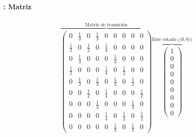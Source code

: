 \documentclass[../main.tex]{subfiles}
\begin{document}
\begin{frame}
  \frametitle{\SECTIONC}
  \framesubtitle{\EJC: Matriz}

  \begin{gather*}
    \overbrace{\begin{pmatrix}
        0 & \frac{1}{3} & 0 & \frac{1}{3} & 0 & 0 & 0 & 0 & 0  \\
        \frac{1}{2} & 0 & \frac{1}{2} & 0 & \frac{1}{4} & 0 & 0 & 0 & 0  \\
        0 & \frac{1}{3} & 0 & 0 & 0 & \frac{1}{3} & 0 & 0 & 0  \\
        \frac{1}{2} & 0 & 0 & 0 & \frac{1}{4} & 0 & \frac{1}{2} & 0 & 0  \\
        0 & \frac{1}{3} & 0 & \frac{1}{3} & 0 & \frac{1}{3} & 0 & \frac{1}{3} & 0  \\
        0 & 0 & \frac{1}{2} & 0 & \frac{1}{4} & 0 & 0 & 0 & \frac{1}{2} \\
        0 & 0 & 0 & \frac{1}{3} & 0 & 0 & 0 & \frac{1}{3} & 0  \\
        0 & 0 & 0 & 0 & \frac{1}{4} & 0 & \frac{1}{2} & 0 & \frac{1}{2} \\
        0 & 0 & 0 & 0 & 0 & \frac{1}{3} & 0 & \frac{1}{3} & 0
    \end{pmatrix}}^{\text{Matriz de transición}}
    \overbrace{\begin{pmatrix}
      1 \\ 0 \\ 0 \\ 0 \\ 0 \\ 0 \\ 0 \\ 0 \\ 0 
    \end{pmatrix}}^{\text{Este estado (\(\langle 0, 0 \rangle\))}}
  \end{gather*}
\end{frame}
\end{document}
